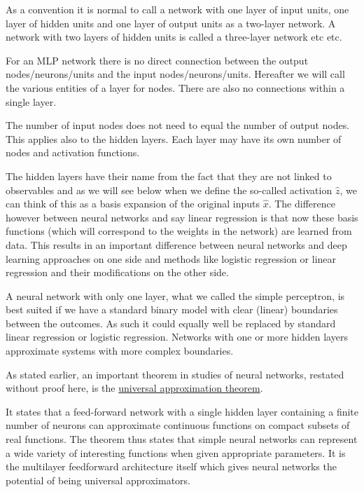 \documentclass[%
oneside,                 %
final,                   %
10pt]{article}
\begin{document}
\noindent
As a convention it is normal to call  a  network with one layer of input units, one layer of hidden
units and one layer of output units as  a two-layer network. A network with two layers of hidden units is called a three-layer network etc etc.

For an MLP network there is no direct connection between the output nodes/neurons/units and  the input nodes/neurons/units.
Hereafter we will call the various entities of a layer for nodes.
There are also no connections within a single layer.

The number of input nodes does not need to equal the number of output
nodes. This applies also to the hidden layers. Each layer may have its
own number of nodes and activation functions.

The hidden layers have their name from the fact that they are not
linked to observables and as we will see below when we define the
so-called activation $\hat{z}$, we can think of this as a basis
expansion of the original inputs $\hat{x}$. The difference however
between neural networks and say linear regression is that now these
basis functions (which will correspond to the weights in the network)
are learned from data. This results in  an important difference between
neural networks and deep learning approaches on one side and methods
like logistic regression or linear regression and their modifications on the other side.



A neural network with only one layer, what we called the simple
perceptron, is best suited if we have a standard binary model with
clear (linear) boundaries between the outcomes. As such it could
equally well be replaced by standard linear regression or logistic
regression. Networks with one or more hidden layers approximate
systems with more complex boundaries.

As stated earlier, 
an important theorem in studies of neural networks, restated without
proof here, is the \href{{http://citeseerx.ist.psu.edu/viewdoc/download?doi=10.1.1.441.7873&rep=rep1&type=pdf}}{universal approximation
theorem}.

It states that a feed-forward network with a single hidden layer
containing a finite number of neurons can approximate continuous
functions on compact subsets of real functions. The theorem thus
states that simple neural networks can represent a wide variety of
interesting functions when given appropriate parameters. It is the
multilayer feedforward architecture itself which gives neural networks
the potential of being universal approximators.
\end{document}
